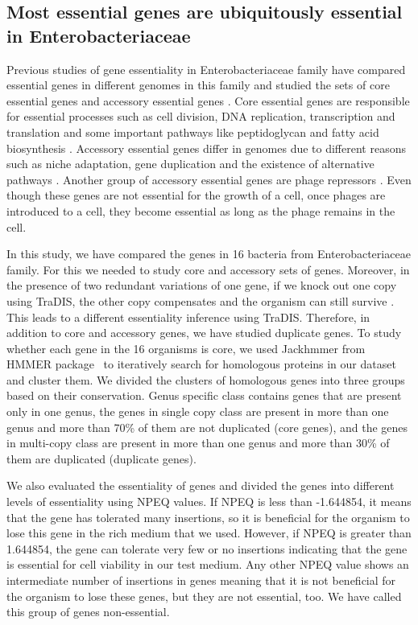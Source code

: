 \documentclass[12pt,letterpaper]{article}
\begin{document}
\subsection{Most essential genes are ubiquitously essential in Enterobacteriaceae}
Previous studies of gene essentiality in Enterobacteriaceae family have compared essential genes in different genomes in this family and studied the sets of core essential genes and accessory essential genes \cite{freed_combining_2016, canals_high-throughput_2012, barquist_comparison_2013}. Core essential genes are responsible for essential processes such as cell division, DNA replication, transcription and translation and some important pathways like peptidoglycan and fatty acid biosynthesis \cite{barquist_comparison_2013}. Accessory essential genes differ in genomes due to different reasons such as niche adaptation, gene duplication and the existence of alternative pathways \cite{freed_combining_2016, canals_high-throughput_2012, barquist_comparison_2013}. Another group of accessory essential genes are phage repressors \cite{barquist_comparison_2013}. Even though these genes are not essential for the growth of a cell, once phages are introduced to a cell, they become essential as long as the phage remains in the cell.

In this study, we have compared the genes in 16 bacteria from Enterobacteriaceae family. For this we needed to study core and accessory sets of genes. Moreover, in the presence of two redundant variations of one gene, if we knock out one copy using TraDIS, the other copy compensates and the organism can still survive \cite{dean_pervasive_2008}. This leads to a different essentiality inference using TraDIS. Therefore, in addition to core and accessory genes, we have studied duplicate genes. To study whether each gene in the 16 organisms is core, we used Jackhmmer from HMMER package~\cite{eddy_accelerated_2011} to iteratively search for homologous proteins in our dataset and cluster them. We divided the clusters of homologous genes into three groups based on their conservation. Genus specific class contains genes that are present only in one genus, the genes in single copy class are present in more than one genus and more than 70\% of them are not duplicated (core genes), and  the genes in multi-copy class are present in more than one genus and more than 30\% of them are duplicated (duplicate genes).

We also evaluated the essentiality of genes and divided the genes into different levels of essentiality using NPEQ values. If NPEQ is less than -1.644854, it means that the gene has tolerated many insertions, so it is beneficial for the organism to lose this gene in the rich medium that we used. However, if NPEQ is greater than 1.644854, the gene can tolerate very few or no insertions indicating that the gene is essential for cell viability in our test medium. Any other NPEQ value shows an intermediate number of insertions in genes meaning that it is not beneficial for the organism to lose these genes, but they are not essential, too. We have called this group of genes non-essential.
\end{document}
